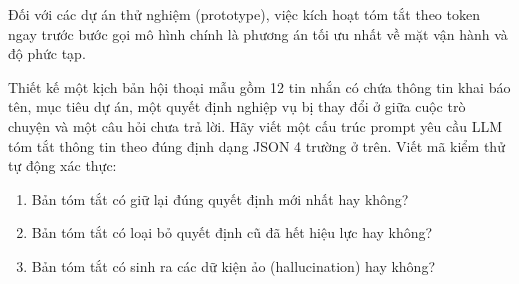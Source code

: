 Đối với các dự án thử nghiệm (prototype), việc kích hoạt tóm tắt theo token ngay trước bước gọi mô hình chính là phương án tối ưu nhất về mặt vận hành và độ phức tạp.

\begin{aicheckpoint}
Thiết kế một kịch bản hội thoại mẫu gồm 12 tin nhắn có chứa thông tin khai báo tên, mục tiêu dự án, một quyết định nghiệp vụ bị thay đổi ở giữa cuộc trò chuyện và một câu hỏi chưa trả lời. Hãy viết một cấu trúc prompt yêu cầu LLM tóm tắt thông tin theo đúng định dạng JSON 4 trường ở trên. Viết mã kiểm thử tự động xác thực:
\begin{enumerate}
  \item Bản tóm tắt có giữ lại đúng quyết định mới nhất hay không?
  \item Bản tóm tắt có loại bỏ quyết định cũ đã hết hiệu lực hay không?
  \item Bản tóm tắt có sinh ra các dữ kiện ảo (hallucination) hay không?
\end{enumerate}
\end{aicheckpoint}
